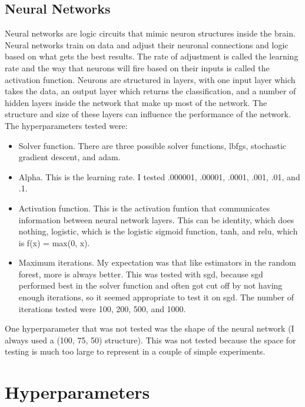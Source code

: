 \documentclass{article}
\begin{document}
\subsection{Neural Networks}

Neural networks are logic circuits that mimic neuron structures inside the brain. Neural networks train on data and adjust their neuronal connections and logic based on what gets the best results. The rate of adjustment is called the learning rate and the way that neurons will fire based on their inputs is called the activation function. Neurons are structured in layers, with one input layer which takes the data, an output layer which returns the classification, and a number of hidden layers inside the network that make up most of the network. The structure and size of these layers can influence the performance of the network.\\

The hyperparameters tested were:

\begin{itemize}
\item Solver function. There are three possible solver functions, lbfgs, stochastic gradient descent, and adam.
\item Alpha. This is the learning rate. I tested .000001, .00001, .0001, .001, .01, and .1.
\item Activation function. This is the activation funtion that communicates information between neural network layers. This can be identity, which does nothing, logistic, which is the logistic sigmoid function, tanh, and relu, which is f(x) = max(0, x).
\item Maximum iterations. My expectation was that like estimators in the random forest, more is always better. This was tested with sgd, because  sgd performed best in the solver function and often got cut off by not having enough iterations, so it seemed appropriate to test it on sgd. The number of iterations tested were 100, 200, 500, and 1000.
\end{itemize}

One hyperparameter that was not tested was the shape of the neural network (I always used a (100, 75, 50) structure). This was not tested because the space for testing is much too large to represent in a couple of simple experiments.\\

\section{Hyperparameters}
\end{document}
